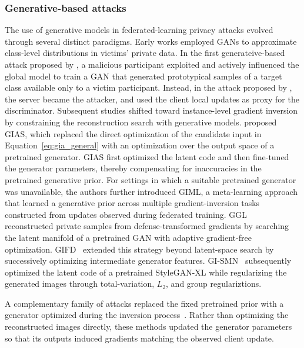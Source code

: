 \subsubsection{Generative-based attacks} 

The use of generative models in federated-learning privacy attacks evolved through several distinct paradigms. Early works employed GANs to approximate class-level distributions in victims’ private data. In the first generateive-based attack proposed by , a malicious participant exploited and actively influenced the global model to train a GAN that generated prototypical samples of a target class available only to a victim participant. Instead, in the attack proposed by , the server became the attacker, and used the client local updates as proxy for the discriminator. Subsequent studies shifted toward instance-level gradient inversion by constraining the reconstruction search with generative models.  proposed GIAS, which replaced the direct optimization of the candidate input in Equation~\eqref{eq:gia_general} with an optimization over the output space of a pretrained generator. GIAS first optimized the latent code and then fine-tuned the generator parameters, thereby compensating for inaccuracies in the pretrained generative prior. For settings in which a suitable pretrained generator was unavailable, the authors further introduced GIML, a meta-learning approach that learned a generative prior across multiple gradient-inversion tasks constructed from updates observed during federated training. GGL~\cite{liAuditingPrivacyDefenses2022a} reconstructed private samples from defense-transformed gradients by searching the latent manifold of a pretrained GAN with adaptive gradient-free optimization. GIFD~\cite{fangGIFDGenerativeGradient2023a} extended this strategy beyond latent-space search by successively optimizing intermediate generator features. GI-SMN~\cite{qian_gismn} subsequently optimized the latent code of a pretrained StyleGAN-XL while regularizing the generated images through total-variation, $L_2$, and group regulariztions.

A complementary family of attacks replaced the fixed pretrained prior with a generator optimized during the inversion process~\cite{renGRNNGenerativeRegression2022a,xuCGIRConditionalGenerative2023,zhangGenerativeGradientInversion2023a}. Rather than optimizing the reconstructed images directly, these methods updated the generator parameters so that its outputs induced gradients matching the observed client update.


